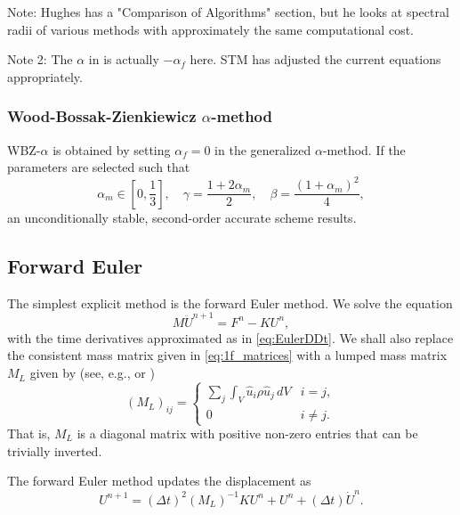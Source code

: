 \documentclass[12pt]{article}
\newcommand{\inverse}[1]{\ensuremath{{#1}^{-1}}} %
\begin{document}
Note:  Hughes has a "Comparison of Algorithms" section, but he looks at
spectral radii of various methods with approximately the same computational cost.

Note 2:  The $\alpha$ in \cite{Hughes2012} is actually $-\alpha_f$ here.  STM has
adjusted the current equations appropriately.

\subsubsection{Wood-Bossak-Zienkiewicz $\alpha$-method}

WBZ-$\alpha$ is obtained by setting $\alpha_f=0$ in the 
generalized $\alpha$-method.
If the parameters are selected such that \cite{Hughes2012}
\begin{equation}
\alpha_m \in \left[0,\frac{1}{3}\right], \quad \gamma = \frac{1+2\alpha_m}{2}, 
\quad \beta = \frac{(1+\alpha_m)^2}{4},
\end{equation}
an unconditionally stable, second-order accurate scheme results.


\subsection{Forward Euler}

The simplest explicit method is the forward Euler method.
We solve the equation
\begin{equation}
M\ddot{U}^{n+1} = F^n - KU^n,
\end{equation}
with the time derivatives approximated as in \eqref{eq:EulerDDt}.
We shall also replace the consistent mass matrix given in \eqref{eq:1f_matrices}
with a lumped mass matrix $M_L$ given by (see, e.g., \cite{Hughes2012} or \cite{Cook2001})
\begin{equation}
(M_L)_{ij} =
\begin{cases}
   \sum_j \int_V \hat{u}_i \rho \hat{u}_j \, dV   & i = j, \\
   0   & i \ne j.
\end{cases}
\end{equation}
That is, $M_L$ is a diagonal matrix with positive non-zero entries
that can be trivially inverted.

The forward Euler method updates the displacement as
\begin{equation}
\label{eq:ForwardEuler}
U^{n+1} = (\Delta t)^2 \inverse{(M_L)}K U^n + U^n + (\Delta t)\dot{U}^n.
\end{equation}
\end{document}
